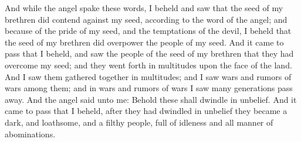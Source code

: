 \bverse \iffalse And while the angel spake these words, I beheld and saw that the seed of my brethren did contend against my seed, according to the word of the angel; and because of the pride of my seed, and the temptations of the devil, I beheld that the seed of my brethren did overpower the people of my seed. \fi
And while the angel spake these words, I beheld and saw that the seed of my brethren did contend against my seed, according to the word of the angel; and because of the pride of my seed, and the temptations of the devil, I beheld that the seed of my brethren did overpower the people of my seed.
\bverse \iffalse And it came to pass that I beheld, and saw the people of the seed of my brethren that they had overcome my seed; and they went forth in multitudes upon the face of the land. \fi
And it came to pass that I beheld, and saw the people of the seed of my brethren that they had overcome my seed; and they went forth in multitudes upon the face of the land.
\bverse \iffalse And I saw them gathered together in multitudes; and I saw wars and rumors of wars among them; and in wars and rumors of wars I saw many generations pass away. \fi
And I saw them gathered together in multitudes; and I saw wars and rumors of wars among them; and in wars and rumors of wars I saw many generations pass away.
\bverse \iffalse And the angel said unto me: Behold these shall dwindle in unbelief. \fi
And the angel said unto me: Behold these shall dwindle in unbelief.
\bverse \iffalse And it came to pass that I beheld, after they had dwindled in unbelief they became a dark, and loathsome, and a filthy people, full of idleness and all manner of abominations. \fi
And it came to pass that I beheld, after they had dwindled in unbelief they became a dark, and loathsome, and a filthy people, full of idleness and all manner of abominations.


